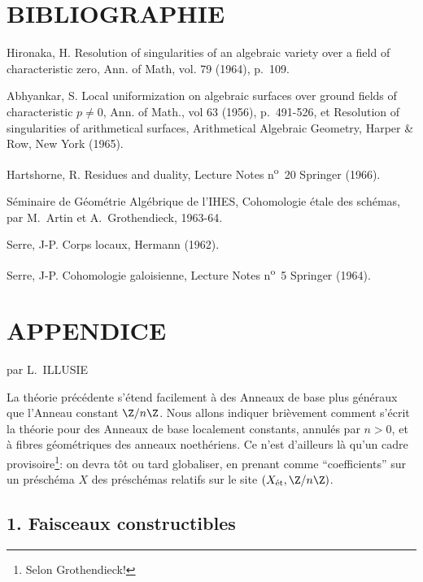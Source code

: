 \section*{BIBLIOGRAPHIE}

\begin{description}[leftmargin=2.5cm,style=nextline]
\item[{[2]}]
Hironaka, H. Resolution of singularities of an algebraic variety over a field of characteristic zero, Ann. of Math, vol. 79 (1964), p.~109.
\item[{[1]}] Abhyankar, S. Local uniformization on algebraic surfaces over ground fields of characteristic $p\ne0$, Ann. of Math., vol 63 (1956), p.~491-526, et Resolution of singularities of arithmetical surfaces, Arithmetical Algebraic Geometry, Harper \& Row, New York (1965).
\item[{[H]}] Hartshorne, R. Residues and duality, Lecture Notes n\textsuperscript{o}~20 Springer (1966).
\item[{[SGAA]}] Séminaire de Géométrie Algébrique de l'IHES, Cohomologie étale des schémas, par M.~Artin et A.~Grothendieck, 1963-64.
\item[{[CL]}] Serre, J-P. Corps locaux, Hermann (1962).
\item[{[CG]}] Serre, J-P. Cohomologie galoisienne, Lecture Notes n\textsuperscript{o}~5 Springer (1964).
\end{description}

\section*{APPENDICE}
\begin{center}
par L.~ILLUSIE
\end{center}

La théorie précédente s'étend facilement à des Anneaux de base plus généraux que l'Anneau constant $\Z/n\Z$. Nous allons indiquer brièvement comment s'écrit la théorie pour des Anneaux de base localement constants, annulés par $n>0$, et à fibres géométriques des anneaux noethériens. Ce n'est d'ailleurs là qu'un cadre provisoire\footnote{Selon Grothendieck!}: on devra tôt ou tard globaliser, en prenant comme ``coefficients'' sur un préschéma $X$ des préschémas relatifs sur le site $(X_{\mathrm{\acute et}},\Z/n\Z)$.

\subsection*{1. Faisceaux constructibles}

